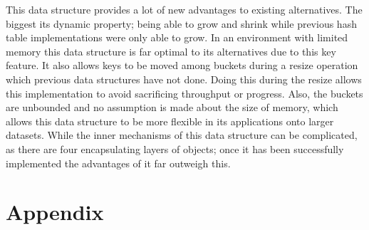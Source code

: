 \documentclass[11pt]{article} %
\begin{document}
This data structure provides a lot of new advantages to existing alternatives. The biggest its dynamic property; being able to grow and shrink while previous hash table implementations were only able to grow. In an environment with limited memory this data structure is far optimal to its alternatives due to this key feature. It also allows keys to be moved among buckets during a resize operation which previous data structures have not done. Doing this during the resize allows this implementation to avoid sacrificing throughput or progress. Also, the buckets are unbounded and no assumption is made about the size of memory, which allows this data structure to be more flexible in its applications onto larger datasets. While the inner mechanisms of this data structure can be complicated, as there are four encapsulating layers of objects; once it has been successfully implemented the advantages of it far outweigh this.

\section{Appendix}
\end{document}
